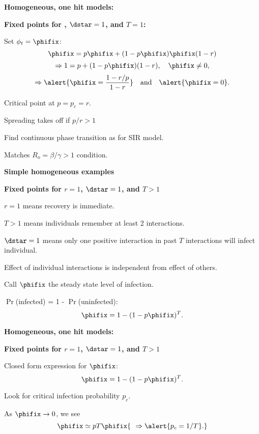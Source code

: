     
  


  \textbf{Homogeneous, one hit models:}

  \textbf{Fixed points for , $\dstar=1$, and $T=1$:}
    
     
      Set $\phi_t = \phifix$:
      {
        $$
        \phifix = p \phifix + ( 1 -p \phifix) \phifix (1-r)
        $$
      }
      {
        $$
        \Rightarrow  1 = p + (1-p\phifix)(1-r), \quad \phifix \ne 0,
        $$
      }
      {
        $$
        \Rightarrow 
        \alert{\phifix = \frac{1 - r/p}{1-r}} 
        \quad \mbox{and} \quad 
        \alert{\phifix = 0}.
        $$
      }
     
      Critical point at $p = p_c = r$.
     
      Spreading takes off if $p/r > 1$
    
      Find continuous phase transition as for SIR model.
    
       Matches $R_o = \beta/\gamma > 1$ condition.
    
  


  \textbf{Simple homogeneous examples}

  \textbf{Fixed points for $r=1$, $\dstar=1$, and $T>1$}
    
    
      \alert{$r=1$} means recovery is immediate.
    
      \alert{$T>1$} means individuals remember at least 2 interactions.
    
      \alert{$\dstar=1$} means only one positive interaction in past $T$ 
      interactions will infect individual.
    
      Effect of individual interactions is independent from effect of others.
    
      Call \alert{$\phifix$} the steady state level of infection.
    
      $\Pr$(infected) = 1 - $\Pr$(uninfected):
      {
      $$
      \phifix = 1 - (1 - p\phifix)^T.
      $$
      }
    
  
  

  \textbf{Homogeneous, one hit models:}

  \textbf{Fixed points for $r=1$, $\dstar=1$, and $T>1$}
    
     Closed form expression for $\phifix$:
      $$
      \phifix = 1 - (1 - p\phifix)^T.
      $$
    
      Look for critical infection probability $p_c$.
    
      As $\phifix \rightarrow 0$, we see
      $$
      \phifix \simeq p T \phifix 
      {\ \ \Rightarrow \alert{p_c = 1/T}.}
      $$
    
